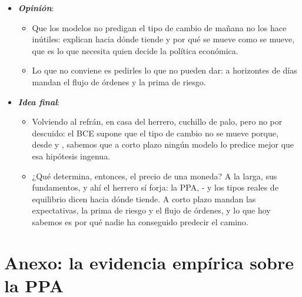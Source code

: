 \documentclass[11pt]{article}
\begin{document}
\begin{itemize}
  \begin{itemize}
  \item El mercado en el que se forma el tipo de cambio y la paradoja del margen \emph{forward} .
  \item La elección del régimen cambiario y la intervención , las uniones monetarias  y las crisis cambiarias .
  \item La coordinación internacional de las políticas y la nueva macroeconomía abierta , y la supervisión de los desequilibrios exteriores .
  \end{itemize}
\item \textbf{\emph{Opinión}}:
  \begin{itemize}
  \item Que los modelos no predigan el tipo de cambio de mañana no los hace inútiles: explican hacia dónde tiende y por qué se mueve como se mueve, que es lo que necesita quien decide la política económica.
  \item Lo que no conviene es pedirles lo que no pueden dar: a horizontes de días mandan el flujo de órdenes y la prima de riesgo.
  \end{itemize}
\item \textbf{\emph{Idea final}}:
  \begin{itemize}
  \item Volviendo al refrán, en casa del herrero, cuchillo de palo, pero no por descuido: el BCE supone que el tipo de cambio no se mueve porque, desde  y , sabemos que a corto plazo ningún modelo lo predice mejor que esa hipótesis ingenua.
  \item ¿Qué determina, entonces, el precio de una moneda? A la larga, sus fundamentos, y ahí el herrero sí forja: la PPA, - y los tipos reales de equilibrio dicen hacia dónde tiende. A corto plazo mandan las expectativas, la prima de riesgo y el flujo de órdenes, y lo que hoy sabemos es por qué nadie ha conseguido predecir el camino.
  \end{itemize}
\end{itemize}

\clearpage
\appendix

\section{Anexo: la evidencia empírica sobre la PPA}\label{anexo:ppa}
\end{document}
